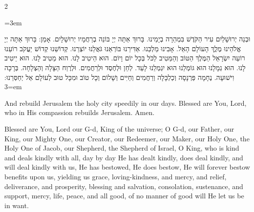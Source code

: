 \documentclass[11pt, openany]{book}
\newenvironment{bilingual}{%
  \par\vspace{4pt}%
  \begin{paracol}{2}%
}{%
  \end{paracol}%
  \par\vspace{2pt}%
}
\newenvironment{hebrewcol}{%
  \switchcolumn[1]%
  \begingroup
  \RTL
  \hebrewfont\large
  \setstretch{1.4}%
  \emergencystretch=3em
  \tolerance=9999
  \parindent=0pt\relax
}{%
  \endRTL
  \endgroup
}
\newenvironment{englishcol}{%
  \switchcolumn[0]%
  \begingroup
  \setstretch{1.4}%
  \emergencystretch=3em
  \tolerance=9999
  \normalsize
  \rightskip=0.12in\relax
}{%
  \endgroup
}
\begin{document}
\begin{bilingual}
\begin{hebrewcol}
וּבְנֵה יְרוּשָׁלַיִם עִיר הַקֹּדֶשׁ בִּמְהֵרָה בְיָמֵינוּ. בָּרוּךְ אַתָּה יְיָ בּוֹנֵה בְרַחֲמָיו יְרוּשָׁלָיִם. אָמֵן:
בָּרוּךְ אַתָּה יְיָ אֱלֹהֵינוּ מֶלֶֶךְ הָעוֹלָם הָאֵל. אָבִינוּ מַלְכֵּנוּ. אַדִּירֵנוּ בּוֹרְאֵנוּ גֹּאֲלֵנוּ יוֹצְרֵנוּ. קְדוֹשֵׁנוּ קְדוֹשׁ יַעֲקֹב רוֹעֵנוּ רוֹעֵה יִשְׂרָאֵל הַמֶּלֶךְ הַטּוֹב וְהַמֵּטִיב לַכֹּל בְּכָל יוֹם וָיוֹם. הוּא הֵיטִיב לָנוּ. הוּא מֵטִיב לָנוּ. הוּא יֵיטִיב לָנוּ. הוּא גְמָלָנוּ הוּא גּוֹמְלֵנוּ הוּא יִגְמְלֵנוּ לָעַד. לְחֵן וּלְחֶסֶד וּלְרַחֲמִים. וּלְרֶוַח הַצָּלָה וְהַצְלָחָה. בְּרָכָה וִישׁוּעָה. נֶחָמָה פַּרְנָסָה וְכַלְכָּלָה וְרַחֲמִים וְחַיִּים וְשָׁלוֹם וְכָל טוֹב וּמִכָּל טוּב לְעוֹלָם אַל יְחַסְּרֵנוּ:
\end{hebrewcol}
\begin{englishcol}
And rebuild Jerusalem the holy city speedily in our days. Blessed are You, Lord, who in His compassion rebuilds Jerusalem. Amen.

Blessed are You, Lord our G-d, King of the universe; O G-d, our Father, our King, our Mighty One, our Creator, our Redeemer, our Maker, our Holy One, the Holy One of Jacob, our Shepherd, the Shepherd of Israel, O King, who is kind and deals kindly with all, day by day He has dealt kindly, does deal kindly, and will deal kindly with us, He has bestowed, He does bestow, He will forever bestow benefits upon us, yielding us grace, loving-kindness, and mercy, and relief, deliverance, and prosperity, blessing and salvation, consolation, sustenance, and support, mercy, life, peace, and all good, of no manner of good will He let us be in want.
\end{englishcol}
\end{bilingual}
\end{document}
